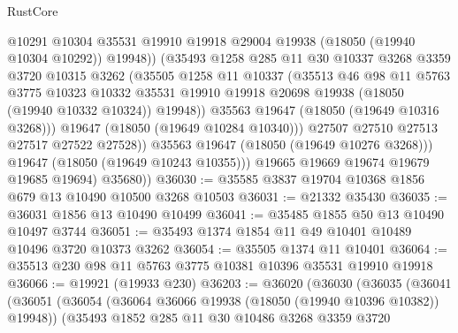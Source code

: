 \begin{lexlean}{RustCore}
\begin{coremodule}
                        @10291
                        @10304
                        @35531
                        @19910
                        @19918
                        @29004
                        @19938
                        (@18050 (@19940 @10304 @10292))
                        @19948))
                    (@35493
                      @1258
                      @285
                      @11
                      @30
                      @10337
                      @3268
                      @3359
                      @3720
                      @10315
                      @3262
                      (@35505
                        @1258
                        @11
                        @10337
                        (@35513
                          @46
                          @98
                          @11
                          @5763
                          @3775
                          @10323
                          @10332
                          @35531
                          @19910
                          @19918
                          @20698
                          @19938
                          (@18050 (@19940 @10332 @10324))
                          @19948))
                      @35563
                      @19647
                      (@18050 (@19649 @10316 @3268)))
                    @19647
                    (@18050 (@19649 @10284 @10340)))
                  @27507
                  @27510
                  @27513
                  @27517
                  @27522
                  @27528))
              @35563
              @19647
              (@18050 (@19649 @10276 @3268)))
            @19647
            (@18050 (@19649 @10243 @10355)))
          @19665
          @19669
          @19674
          @19679
          @19685
          @19694)
        @35680))
@36030 := @35585 @3837 @19704 @10368 @1856 @679 @13 @10490 @10500 @3268 @10503
@36031 := @21332 @35430
@36035 := @36031 @1856 @13 @10490 @10499
@36041 := @35485 @1855 @50 @13 @10490 @10497 @3744
@36051 := @35493 @1374 @1854 @11 @49 @10401 @10489 @10496 @3720 @10373 @3262
@36054 := @35505 @1374 @11 @10401
@36064 := @35513 @230 @98 @11 @5763 @3775 @10381 @10396 @35531 @19910 @19918
@36066 := @19921 (@19933 @230)
@36203 := @36020
    (@36030
      (@36035
        (@36041
          (@36051
            (@36054 (@36064 @36066 @19938 (@18050 (@19940 @10396 @10382)) @19948))
            (@35493
              @1852
              @285
              @11
              @30
              @10486
              @3268
              @3359
              @3720

\end{coremodule}
\end{lexlean}
